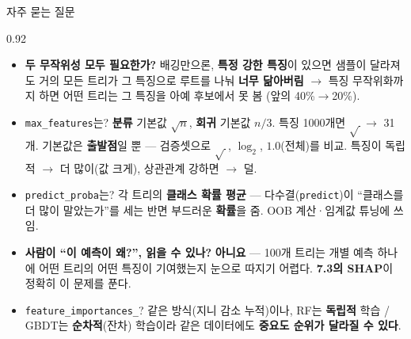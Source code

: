 \begin{frame}{자주 묻는 질문}
\begin{center}\begin{varwidth}{0.92\textwidth}
  \small
  \begin{itemize}
    \item \textbf{두 무작위성 모두 필요한가?} 배깅만으론, \textbf{특정
      강한 특징}이 있으면 샘플이 달라져도 거의 모든 트리가 그 특징으로
      루트를 나눠 \textbf{너무 닮아버림} $\to$ 특징 무작위화까지 하면
      어떤 트리는 그 특징을 아예 후보에서 못 봄 (앞의 40\%$\to$20\%).
    \item \texttt{max\_features}는? \textbf{분류} 기본값 $\sqrt{n}$,
      \textbf{회귀} 기본값 $n/3$. 특징 1000개면 $\sqrt{\,}\to$ 31개.
      기본값은 \textbf{출발점}일 뿐 — 검증셋으로 $\sqrt{\,}$, $\log_2$,
      $1.0$(전체)를 비교. 특징이 독립적 $\to$ 더 많이(값 크게),
      상관관계 강하면 $\to$ 덜.
    \item \texttt{predict\_proba}는? 각 트리의 \textbf{클래스 확률
      평균} — 다수결(\texttt{predict})이 ``클래스를 더 많이 말았는가''를
      세는 반면 부드러운 \textbf{확률}을 줌. OOB 계산·임계값 튜닝에
      쓰임.
    \item \textbf{사람이 ``이 예측이 왜?'', 읽을 수 있나?} \textbf{아니요}
      — 100개 트리는 개별 예측 하나에 어떤 트리의 어떤 특징이 기여했는지
      눈으로 따지기 어렵다. \textbf{7.3의 SHAP}이 정확히 이 문제를 푼다.
    \item \texttt{feature\_importances\_}? 같은 방식(지니 감소 누적)이나,
      RF는 \textbf{독립적} 학습 / GBDT는 \textbf{순차적}(잔차) 학습이라
      같은 데이터에도 \textbf{중요도 순위가 달라질 수 있다}.
  \end{itemize}
\end{varwidth}\end{center}
\end{frame}
